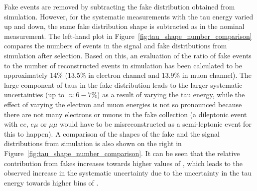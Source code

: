 Fake events are removed by subtracting the fake distribution obtained from simulation. However, for the
systematic measurements with the tau energy varied up and down, the same fake distribution shape is subtracted
as in the nominal measurement. The left-hand plot in Figure~\ref{fig:tau_shape_number_comparison} compares the
numbers of events in the signal and fake distributions from \ttbar simulation after selection.
Based on this, an evaluation of the ratio of fake events to the number of reconstructed \ttbar events in
simulation has been calculated to be approximately 14\% (13.5\% in electron channel and 13.9\% in muon
channel). The large component of taus in the fake distribution leads to the larger systematic uncertainties
(up to $\approx6-7\%$) as a result of varying the tau energy, while the effect of varying the electron and
muon energies is not so pronounced because there are not many electrons or muons in the fake collection (a
dileptonic \ttbar event with $ee$, $e\mu$ or $\mu\mu$ would have to be misreconstructed as a semi-leptonic
event for this to happen). A comparison of the shapes of the fake and the signal \met distributions from
simulation is also shown on the right in Figure~\ref{fig:tau_shape_number_comparison}. It can be seen that the
relative contribution from fakes increases towards higher values of \met, which leads to the observed increase
in the systematic uncertainty due to the uncertainty in the tau energy towards higher bins of \met.

